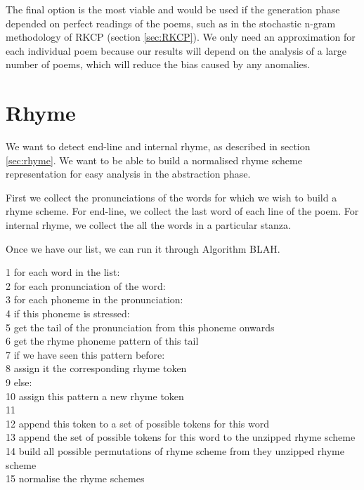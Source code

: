 The final option is the most viable and would be used if the generation phase depended on perfect readings of the poems, such as in the stochastic n-gram methodology of RKCP (section \ref{sec:RKCP}). We only need an approximation for each individual poem because our results will depend on the analysis of a large number of poems, which will reduce the bias caused by any anomalies.


\section{Rhyme}

We want to detect end-line and internal rhyme, as described in section \ref{sec:rhyme}. We want to be able to build a normalised rhyme scheme representation for easy analysis in the abstraction phase. 

First we collect the pronunciations of the words for which we wish to build a rhyme scheme. For end-line, we collect the last word of each line of the poem. For internal rhyme, we collect the all the words in a particular stanza.

Once we have our list, we can run it through Algorithm BLAH.

1 for each word in the list:\\
2 	for each pronunciation of the word:\\
3		for each phoneme in the pronunciation:\\
4			if this phoneme is stressed:\\
5				get the tail of the pronunciation from this phoneme onwards\\
6				get the rhyme phoneme pattern of this tail\\
7				if we have seen this pattern before: \\
8					assign it the corresponding rhyme token\\
9				else:\\
10					assign this pattern a new rhyme token\\
11				\\
12				append this token to a set of possible tokens for this word\\				
13	append the set of possible tokens for this word to the unzipped rhyme scheme\\
14 build all possible permutations of rhyme scheme from they unzipped rhyme scheme\\
15 normalise the rhyme schemes\\
	
